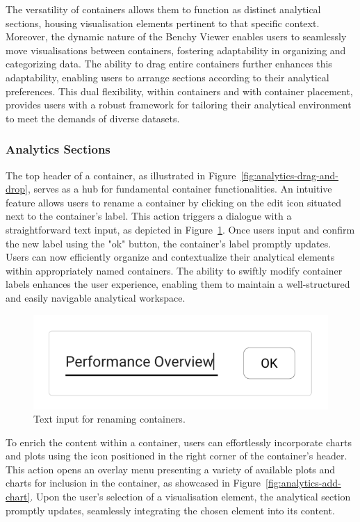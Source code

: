 The versatility of containers allows them to function as distinct analytical sections, housing visualisation elements pertinent to that specific context. Moreover, the dynamic nature of the Benchy Viewer enables users to seamlessly move visualisations between containers, fostering adaptability in organizing and categorizing data. The ability to drag entire containers further enhances this adaptability, enabling users to arrange sections according to their analytical preferences. This dual flexibility, within containers and with container placement, provides users with a robust framework for tailoring their analytical environment to meet the demands of diverse datasets.

\subsubsection{Analytics Sections}

The top header of a container, as illustrated in Figure~\ref{fig:analytics-drag-and-drop}, serves as a hub for fundamental container functionalities. An intuitive feature allows users to rename a container by clicking on the edit icon situated next to the container's label. This action triggers a dialogue with a straightforward text input, as depicted in Figure~\ref{fig:analytics-section-rename}. Once users input and confirm the new label using the "ok" button, the container's label promptly updates.\\
Users can now efficiently organize and contextualize their analytical elements within appropriately named containers. The ability to swiftly modify container labels enhances the user experience, enabling them to maintain a well-structured and easily navigable analytical workspace.

\begin{figure}[h]
  \centering
  \includegraphics[width=0.25\linewidth]{figures/analytics-section-rename.png}
  \caption{Text input for renaming containers.}
  \label{fig:analytics-section-rename}
\end{figure}

To enrich the content within a container, users can effortlessly incorporate charts and plots using the icon positioned in the right corner of the container's header. This action opens an overlay menu presenting a variety of available plots and charts for inclusion in the container, as showcased in Figure~\ref{fig:analytics-add-chart}. Upon the user's selection of a visualisation element, the analytical section promptly updates, seamlessly integrating the chosen element into its content.

